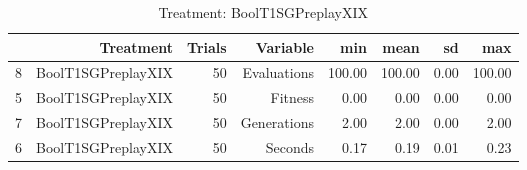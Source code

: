 \begin{table}[ht]
\centering
\begin{tabular}{rrrrrrrr}
  \hline
 & Treatment & Trials & Variable & min & mean & sd & max \\ 
  \hline
8 & BoolT1SGPreplayXIX &  50 & Evaluations & 100.00 & 100.00 & 0.00 & 100.00 \\ 
  5 & BoolT1SGPreplayXIX &  50 & Fitness & 0.00 & 0.00 & 0.00 & 0.00 \\ 
  7 & BoolT1SGPreplayXIX &  50 & Generations & 2.00 & 2.00 & 0.00 & 2.00 \\ 
  6 & BoolT1SGPreplayXIX &  50 & Seconds & 0.17 & 0.19 & 0.01 & 0.23 \\ 
   \hline
\end{tabular}
\caption{Treatment: BoolT1SGPreplayXIX} 
\end{table}
